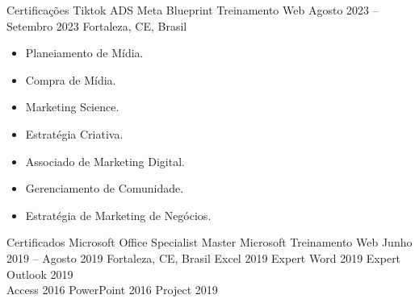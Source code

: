 \begin{commentH}
\cvevent
	{\faNimblr Certificações Tiktok ADS%
		\quad%
		\hrulefill%
		}
	{Meta Blueprint \hfill \faEdge Treinamento Web}
	{Agosto 2023 -- Setembro 2023}
	{Fortaleza, CE, Brasil}
\vspace{-0.5em}
\begin{multicols}{2}
	\begin{itemize}[leftmargin=*,itemsep=0.5em,topsep=0.5em]
		\item Planeiamento de Mídia.
		\item Compra de Mídia.
		\item Marketing Science.
		\item Estratégia Criativa.
		\item Associado de Marketing Digital.
		\item Gerenciamento de Comunidade.
		\item Estratégia de Marketing de Negócios.
	\end{itemize}
\end{multicols}
\end{commentH}
\begin{commentI}
\cvevent
{\faMicrosoft Certificados Microsoft Office Specialist Master}
{Microsoft \hfill \faEdge Treinamento Web}
{Junho 2019 -- Agosto 2019}
{Fortaleza, CE, Brasil}
\cvtag
{\faFileExcel[regular] Excel 2019 Expert}
\cvtag
{\faFileWord[regular] Word 2019 Expert}
\cvtag
{Outlook 2019} \\
\cvtag
{\faDatabase Access 2016}
\cvtag
{\faFilePowerpoint[regular] PowerPoint 2016}
\cvtag
{Project 2019}
\end{commentI}
